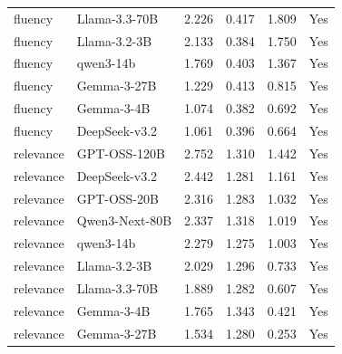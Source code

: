 \begin{table}[t]
{\begin{tabular}{llrrrl}
fluency & Llama-3.3-70B & 2.226 & 0.417 & 1.809 & Yes \\
fluency & Llama-3.2-3B & 2.133 & 0.384 & 1.750 & Yes \\
fluency & qwen3-14b & 1.769 & 0.403 & 1.367 & Yes \\
fluency & Gemma-3-27B & 1.229 & 0.413 & 0.815 & Yes \\
fluency & Gemma-3-4B & 1.074 & 0.382 & 0.692 & Yes \\
fluency & DeepSeek-v3.2 & 1.061 & 0.396 & 0.664 & Yes \\
relevance & GPT-OSS-120B & 2.752 & 1.310 & 1.442 & Yes \\
relevance & DeepSeek-v3.2 & 2.442 & 1.281 & 1.161 & Yes \\
relevance & GPT-OSS-20B & 2.316 & 1.283 & 1.032 & Yes \\
relevance & Qwen3-Next-80B & 2.337 & 1.318 & 1.019 & Yes \\
relevance & qwen3-14b & 2.279 & 1.275 & 1.003 & Yes \\
relevance & Llama-3.2-3B & 2.029 & 1.296 & 0.733 & Yes \\
relevance & Llama-3.3-70B & 1.889 & 1.282 & 0.607 & Yes \\
relevance & Gemma-3-4B & 1.765 & 1.343 & 0.421 & Yes \\
relevance & Gemma-3-27B & 1.534 & 1.280 & 0.253 & Yes \\
\bottomrule
\end{tabular}
}
\end{table}